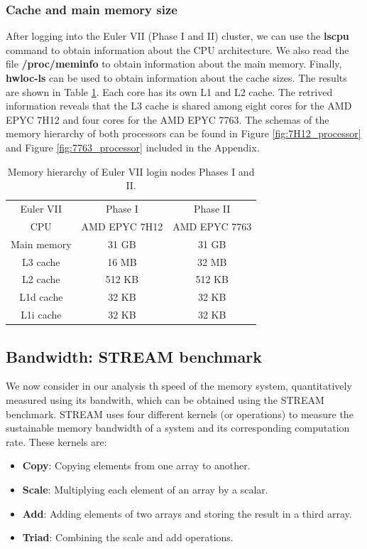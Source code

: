 \documentclass[unicode,11pt,a4paper,oneside,numbers=endperiod,openany]{scrartcl}
\begin{document}
\subsubsection{Cache and main memory size}
After logging into the Euler VII (Phase I and II) cluster, we can use the \textbf{lscpu} command to obtain information
about the CPU architecture. We also read the file \textbf{/proc/meminfo} to obtain information about the main memory.
Finally, \textbf{hwloc-ls} can be used to obtain information about the cache sizes. The results are shown in Table \ref{tab:memory_config}.
Each core has its own L1 and L2 cache. The retrived information reveals that the L3 cache is shared among eight 
cores for the AMD EPYC 7H12 and four cores for the AMD EPYC 7763. 
The schemas of the memory hierarchy of both processors can be found in 
Figure \ref{fig:7H12_processor} and Figure \ref{fig:7763_processor} included in the Appendix.


\begin{table}[h]
    \centering
    \caption{Memory hierarchy of Euler VII login nodes Phases I and II.}
    \begin{tabular}{||c c c||} 
     \hline
    Euler VII & Phase I & Phase II \\ [0.5ex] 
    CPU & AMD EPYC 7H12 & AMD EPYC 7763 \\
    \hline\hline
     Main memory & 31 GB & 31 GB \\ 
     \hline
     L3 cache & 16 MB & 32 MB \\
     \hline
     L2 cache & 512 KB & 512 KB \\
     \hline
     L1d cache & 32 KB & 32 KB \\
     \hline
     L1i cache & 32 KB & 32 KB \\
     \hline
    \end{tabular}
    \label{tab:memory_config}
\end{table}


\subsection{Bandwidth: STREAM benchmark}\label{sec:STREAM_benchmark}
We now consider in our analysis th speed of the memory system, quantitatively measured using its 
bandwith, which can be obtained using the STREAM benchmark. STREAM uses four different kernels (or 
operations) to measure the sustainable memory bandwidth of a system and its corresponding
computation rate. These kernels are:
\begin{itemize}
    \item \textbf{Copy}: Copying elements from one array to another.
    \item \textbf{Scale}: Multiplying each element of an array by a scalar.
    \item \textbf{Add}: Adding elements of two arrays and storing the result in a third array.
    \item \textbf{Triad}: Combining the scale and add operations.
\end{itemize}
\end{document}
